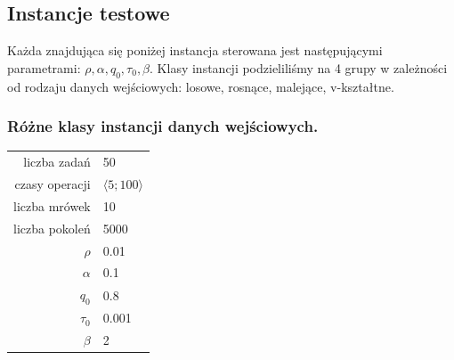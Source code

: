 \documentclass[10pt,a4paper]{article}
\begin{document}
\vspace{15mm}
\subsection{Instancje testowe}
Każda znajdująca się poniżej instancja sterowana jest następującymi
parametrami: $ \rho, \alpha, q_0, \tau_0, \beta $.  Klasy instancji
podzieliliśmy na 4 grupy w zależności od rodzaju danych wejściowych: losowe,
rosnące, malejące, v-kształtne.


\subsubsection{Różne klasy instancji danych wejściowych.}
\vspace{6 mm}
\begin{center}
\begin{tabular}{|r|l|}
  \hline
  liczba zadań & 50 \\
  czasy operacji & $ \langle 5;100 \rangle $  \\
  liczba mrówek & 10 \\
  liczba pokoleń & 5000 \\
  $ \rho $ & 0.01 \\
  $ \alpha $ & 0.1 \\
  $ q_0 $ & 0.8 \\
  $ \tau_0 $ & 0.001 \\
  $ \beta $ & 2 \\
  \hline
\end{tabular}
\end{center}
\end{document}
